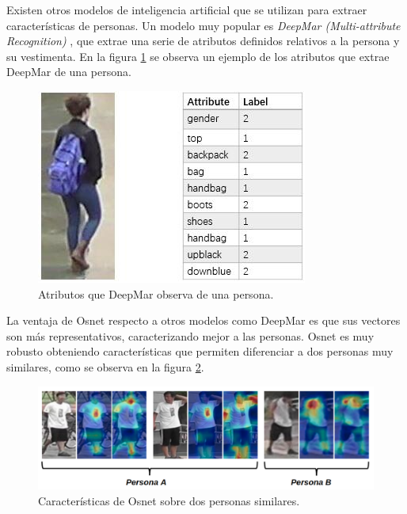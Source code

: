 
\newpage

Existen otros modelos de inteligencia artificial que se utilizan para extraer características de personas. Un modelo muy popular es \textit{DeepMar (Multi-attribute Recognition)} \citep{DEEPMAR}, que extrae una serie de atributos definidos relativos a la persona y su vestimenta. En la figura \ref{fig:deepmar} se observa un ejemplo de los atributos que extrae DeepMar de una persona.

\begin{figure}[ht]
	\centering
	\includegraphics[scale=.8]{./Figures/deepmar.png}
	\caption{Atributos que DeepMar observa de una persona\protect\footnotemark.}
	\label{fig:deepmar}
\end{figure}


La ventaja de Osnet respecto a otros modelos como DeepMar es que sus vectores son más representativos, caracterizando mejor a las personas. Osnet es muy robusto obteniendo características que permiten diferenciar a dos personas muy similares, como se observa en la figura \ref{fig:osnetDosPersonas}.

\begin{figure}[ht]
	\centering
	\includegraphics[scale=0.5]{./Figures/osnetDosPersonas.png}
	\caption{Características de Osnet sobre dos personas similares\protect\footnotemark.}
	\label{fig:osnetDosPersonas}
\end{figure}

